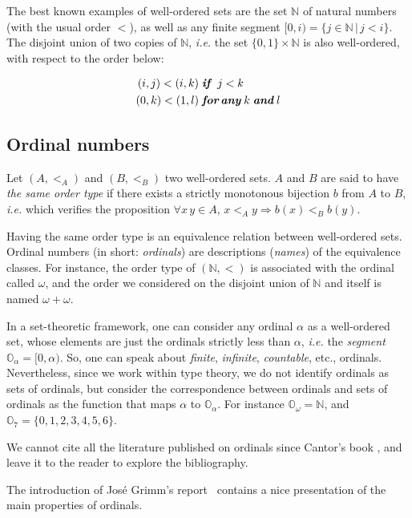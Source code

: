 The best known examples of well-ordered sets are the set $\mathbb{N}$ of natural numbers (with the usual order $<$), as well as any finite segment $[0,i)=\{j\in\mathbb{N}\,|\,j<i\}$.
The disjoint union of two copies of $\mathbb{N}$, \emph{i.e.} the set $\{0,1\}\times\mathbb{N}$ is also well-ordered,
with respect to the order below:

\begin{align*}
(i,j) < (i,k) & \;\textit{\textbf{if} }\; j < k\\
(0,k) < (1,l) & \;\textit{\textbf{for\,any}}\;k \;\textit{\textbf{and}} \; l
\end{align*}

\subsection{Ordinal numbers}


Let $(A,<_A)$ and $(B,<_B)$ two well-ordered sets. $A$ and $B$ are said to have \emph{the same order type} if 
there exists a strictly monotonous bijection $b$ from $A$ to $B$, \emph{i.e.} which verifies the proposition
$\forall x\,y\in A,\, x <_A y \Rightarrow b(x) <_B  b(y)$.

Having the same order type is an equivalence relation between well-ordered sets. Ordinal numbers (in short: \emph{ordinals})  are descriptions (\emph{names}) of the equivalence classes.
For instance, the order type of $(\mathbb{N},<)$ is associated with the ordinal called  $\omega$, and the order we considered on 
the disjoint union of $\mathbb{N}$ and itself is named $\omega+\omega$.

In a set-theoretic framework, one can consider any ordinal $\alpha$ as a well-ordered set, whose  elements are just the ordinals strictly less than $\alpha$, \emph{i.e.} the \emph{segment} $\mathbb{O}_\alpha=[0, \alpha)$. So, one can speak about \emph{finite}, \emph{infinite}, \emph{countable}, etc., ordinals. Nevertheless, since we work within type theory, 
we do not identify ordinals as sets of ordinals, but consider the correspondence between ordinals and sets of ordinals as the function that maps $\alpha$ to $\mathbb{O}_\alpha$.
For instance $\mathbb{O}_\omega=\mathbb{N}$, and $\mathbb{O}_7=\{0,1,2,3,4,5,6\}$.


We cannot cite all the literature published on ordinals since Cantor's book
\cite{cantorbook}, and 
leave it to the reader to explore the bibliography.

The introduction of Jos\'e Grimm's report~\cite{grimm:hal-00911710} contains a nice presentation of the main properties of ordinals.


